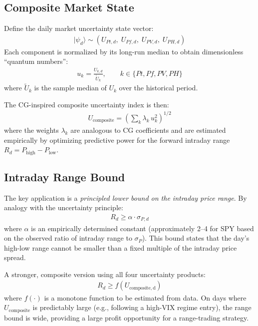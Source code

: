 \documentclass[11pt]{article}
\begin{document}
\subsection{Composite Market State}

Define the daily market uncertainty state vector:
\begin{align}
    |\psi_d\rangle \sim \left( U_{Pt,d},\; U_{Pf,d},\; U_{PV,d},\; U_{PH,d} \right)
\end{align}
Each component is normalized by its long-run median to obtain dimensionless ``quantum numbers'':
\begin{align}
    u_k = \frac{U_{k,d}}{\tilde{U}_k}, \qquad k \in \{Pt, Pf, PV, PH\}
\end{align}
where $\tilde{U}_k$ is the sample median of $U_k$ over the historical period.

The CG-inspired composite uncertainty index is then:
\begin{align}
    U_\mathrm{composite} = \left(\sum_{k} \lambda_k\, u_k^2\right)^{1/2}
\end{align}
where the weights $\lambda_k$ are analogous to CG coefficients and are estimated empirically by optimizing predictive power for the forward intraday range $R_d = P_\mathrm{high} - P_\mathrm{low}$.

\subsection{Intraday Range Bound}

The key application is a \textit{principled lower bound on the intraday price range}. By analogy with the uncertainty principle:
\begin{align}
    R_d \geq \alpha \cdot \sigma_{P,d}
\end{align}
where $\alpha$ is an empirically determined constant (approximately 2--4 for SPY based on the observed ratio of intraday range to $\sigma_P$). This bound states that the day's high-low range cannot be smaller than a fixed multiple of the intraday price spread.

A stronger, composite version using all four uncertainty products:
\begin{align}
    R_d \geq f(U_\mathrm{composite,d})
\end{align}
where $f(\cdot)$ is a monotone function to be estimated from data. On days where $U_\mathrm{composite}$ is predictably large (e.g., following a high-VIX regime entry), the range bound is wide, providing a large profit opportunity for a range-trading strategy.
\end{document}

